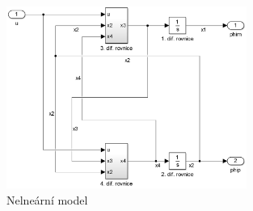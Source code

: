 \documentclass[11pt,a4paper]{article}
\begin{document}
\begin{figure}[H]
\centering
\includegraphics[width=0.7\textwidth]{schema_nelinearni_celek.jpg}
\caption{Nelneární model}
\label{model:nelin:celk}
\end{figure}
\end{document}
